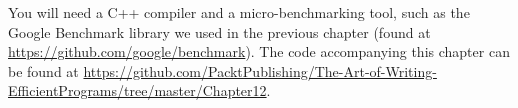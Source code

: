 You will need a C++ compiler and a micro-benchmarking tool, such as the Google Benchmark library we used in the previous chapter (found at \url{https://github.com/google/benchmark}). The code accompanying this chapter can be found at \url{https://github.com/PacktPublishing/The-Art-of-Writing-EfficientPrograms/tree/master/Chapter12}.